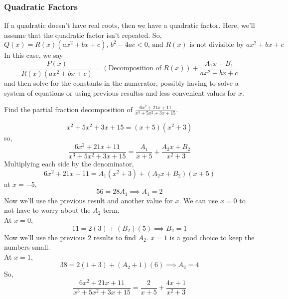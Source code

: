 \subsubsection{Quadratic Factors}
\noindent
If a quadratic doesn't have real roots, then we have a quadratic factor. Here, we'll assume that the quadratic factor isn't repeated. 
So, 
\begin{equation*}
	Q(x) = R(x)(ax^2+bx+c)\text{, }b^2-4ac < 0\text{, and }R(x)\text{ is not divisible by }ax^2+bx+c
\end{equation*}
In this case, we say
\begin{equation*}
	\frac{P(x)}{R(x)(ax^2+bx+c)} = \left(\text{Decomposition of }R(x)\right)+\frac{A_1x+B_1}{ax^2+bx+c}
\end{equation*}
and then solve for the constants in the numerator, possibly having to solve a system of equations or using previous resultss and less convenient values for $x$.

\begin{example}
	Find the partial fraction decomposition of $\frac{6x^2+21x+11}{x^3+5x^2+3x+15}$.
\end{example}
\begin{equation*}
	x^2+5x^2+3x+15 = (x+5)(x^2+3)
\end{equation*}
so,
\begin{equation*}
	\frac{6x^2+21x+11}{x^3+5x^2+3x+15} = \frac{A_1}{x+5}+\frac{A_2x+B_2}{x^2+3}
\end{equation*}
Multiplying each side by the denominator,
\begin{equation*}
	6x^2+21x+11 = A_1(x^2+3)+(A_2x+B_2)(x+5)
\end{equation*}
at $x=-5$,
\begin{equation*}
	56 = 28A_1 \implies A_1 = 2
\end{equation*}
Now we'll use the previous result and another value for $x$. We can use $x=0$ to not have to worry about the $A_2$ term.\\
At $x=0$,
\begin{equation*}
	11 = 2(3) + (B_2)(5) \implies B_2 = 1
\end{equation*}
Now we'll use the previous 2 results to find $A_2$. $x=1$ is a good choice to keep the numbers small.\\
At $x=1$,
\begin{equation*}
	38 = 2(1+3)+(A_2+1)(6) \implies A_2 = 4
\end{equation*}
So,
\begin{equation*}
	\frac{6x^2+21x+11}{x^3+5x^2+3x+15} = \frac{2}{x+5}+\frac{4x+1}{x^2+3}
\end{equation*}
